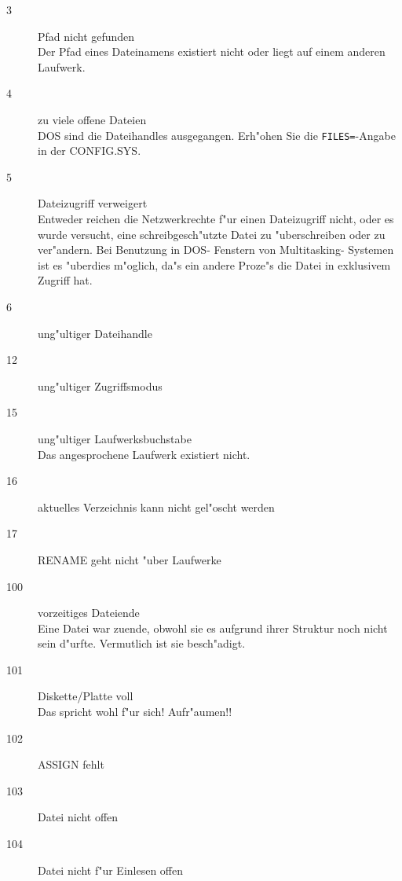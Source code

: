 \documentclass[12pt,a4paper,twoside]{report}
\newcommand{\tty}[1]{{\tt #1}}
\begin{document}
{\begin{description}
\item[3]{Pfad nicht gefunden\\
         Der Pfad eines Dateinamens existiert nicht oder liegt auf
         einem anderen Laufwerk.}

\item[4]{zu viele offene Dateien\\
         DOS sind die Dateihandles ausgegangen.  Erh"ohen Sie die
         \tty{FILES=}-Angabe in der CONFIG.SYS.}

\item[5]{Dateizugriff verweigert\\
         Entweder reichen die Netzwerkrechte f"ur einen Dateizugriff
         nicht, oder es wur\-de ver\-sucht, ei\-ne schreib\-ge\-sch"utz\-te Da\-tei
         zu "uber\-schrei\-ben oder zu ver\-"an\-dern.  Bei Benutzung in
         DOS- Fenstern von Multitasking- Systemen ist es "uberdies m"oglich,
         da"s ein andere Proze"s die Datei in exklusivem Zugriff hat.}

\item[6]{ung"ultiger Dateihandle}

\item[12]{ung"ultiger Zugriffsmodus}

\item[15]{ung"ultiger Laufwerksbuchstabe\\
          Das angesprochene Laufwerk existiert nicht.}


\item[16]{aktuelles Verzeichnis kann nicht gel"oscht werden}

\item[17]{RENAME geht nicht "uber Laufwerke}

\item[100]{vorzeitiges Dateiende\\
           Eine Datei war zuende, obwohl sie es aufgrund ihrer Struktur
           noch nicht sein d"urfte.  Vermutlich ist sie besch"adigt.}

\item[101]{Diskette/Platte voll\\
           Das spricht wohl f"ur sich!  Aufr"aumen!!}

\item[102]{ASSIGN fehlt}

\item[103]{Datei nicht offen}

\item[104]{Datei nicht f"ur Einlesen offen}


\end{description}}
\end{document}

